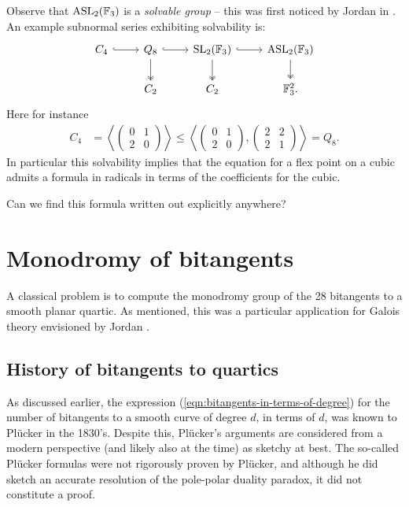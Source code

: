 \documentclass[11pt]{amsart}
\providecommand{\ASL}{\mathrm{ASL}}
\begin{document}
Observe that $\ASL_2(\F_3)$ is a \textit{solvable group} -- this was first noticed by Jordan in \cite[III.III\S1]{Jordan}. An example subnormal series exhibiting solvability is:
\[ \begin{tikzcd}
    C_4\rar[hook] & Q_8\rar[hook]\dar[two heads] & \SL_2(\F_3)\dar[two heads]\rar[hook] & \ASL_2(\F_3)\dar[two heads]\\
     & C_2 & C_2 & \F_3^2.
\end{tikzcd} \]
Here for instance
\begin{align*}
    C_4 &= \left\langle \begin{pmatrix} 0 & 1 \\ 2 & 0 \end{pmatrix}  \right\rangle \le \left\langle \begin{pmatrix} 0 & 1 \\ 2 & 0 \end{pmatrix}, \begin{pmatrix} 2 & 2 \\ 2 & 1 \end{pmatrix}  \right\rangle = Q_8.
\end{align*}
In particular this solvability implies that the equation for a flex point on a cubic admits a formula in radicals in terms of the coefficients for the cubic.

\begin{question} Can we find this formula written out explicitly anywhere?
\end{question}


\section{Monodromy of bitangents}

A classical problem is to compute the monodromy group of the 28 bitangents to a smooth planar quartic. As mentioned, this was a particular application for Galois theory envisioned by Jordan \cite[III.VI]{Jordan}.

\subsection{History of bitangents to quartics}

As discussed earlier, the expression (\autoref{eqn:bitangents-in-terms-of-degree}) for the number of bitangents to a smooth curve of degree $d$, in terms of $d$, was known to Pl\"{u}cker in the 1830's. Despite this, Pl\"{u}cker's arguments are considered from a modern perspective (and likely also at the time) as sketchy at best. The so-called Pl\"{u}cker formulas were not rigorously proven by Pl\"{u}cker, and although he did sketch an accurate resolution of the pole-polar duality paradox, it did not constitute a proof.
\end{document}
